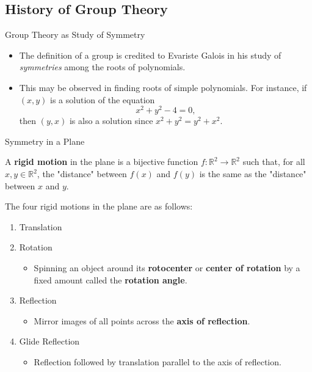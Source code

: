 \documentclass{beamer}
\begin{document}
\subsection{History of Group Theory}

\begin{frame}{Group Theory as Study of Symmetry}
\begin{itemize}
\item The definition of a group is credited to Evariste Galois in his study of \emph{symmetries} among the roots of polynomials.
\item This may be observed in finding roots of simple polynomials. For instance, if $(x, y)$ is a solution of the equation
\[
x^2 + y^2 - 4 = 0,
\]
then $(y, x)$ is also a solution since $x^2 + y^2 = y^2 + x^2$.
\end{itemize}
\end{frame}

\begin{frame}{Symmetry in a Plane}
\begin{definition}
\justifying
A \textbf{rigid motion} in the plane is a bijective function $f: \mathbb{R}^2 \to \mathbb{R}^2$ such that, for all $x, y \in \mathbb{R}^2$, the "distance" between $f(x)$ and $f(y)$ is the same as the "distance" between $x$ and $y$.
\end{definition}
\justifying
The four rigid motions in the plane are as follows:
\begin{enumerate}
\item Translation
\item Rotation 
\begin{itemize}
\justifying
\item Spinning an object around its \textbf{rotocenter} or \textbf{center of rotation} by a fixed amount called the \textbf{rotation angle}.
\end{itemize} 
\item Reflection
\begin{itemize}
\justifying
\item Mirror images of all points across the \textbf{axis of reflection}.
\end{itemize}
\item Glide Reflection
\begin{itemize}
\justifying
\item Reflection followed by translation parallel to the axis of reflection.
\end{itemize}
\end{enumerate}
\end{frame}
\end{document}
